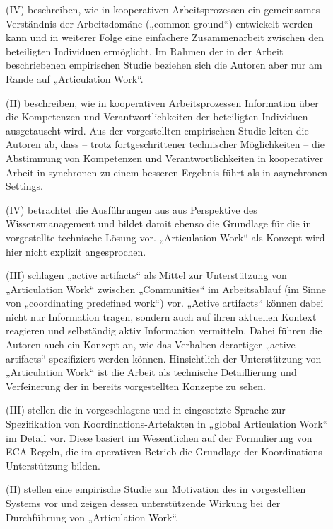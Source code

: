 \begin{description}
	\item[\citet{Convertino08}] (IV) beschreiben, wie in kooperativen Arbeitsprozessen ein gemeinsames Verständnis der Arbeitsdomäne („common ground“) entwickelt werden kann und in weiterer Folge eine einfachere Zusammenarbeit zwischen den beteiligten Individuen ermöglicht. Im Rahmen der in der Arbeit beschriebenen empirischen Studie beziehen sich die Autoren aber nur am Rande auf „Articulation Work“.
	\item[\citet{Larsen08}] (II) beschreiben, wie in kooperativen Arbeitsprozessen Information über die Kompetenzen und Verantwortlichkeiten der beteiligten Individuen ausgetauscht wird. Aus der vorgestellten empirischen Studie leiten die Autoren ab, dass -- trotz fortgeschrittener technischer Möglichkeiten -- die Abstimmung von Kompetenzen und Verantwortlichkeiten in kooperativer Arbeit in synchronen zu einem besseren Ergebnis führt als in asynchronen Settings.
	\item[\citet{Cabitza08}] (IV) betrachtet die Ausführungen aus \citet{Cabitza07} aus Perspektive des Wissensmanagement und bildet damit ebenso die Grundlage für die in \citep{Cabitza09} vorgestellte technische Lösung vor. „Articulation Work“ als Konzept wird hier nicht explizit angesprochen.
	\item[\citet{Cabitza09}] (III) schlagen „active artifacts“ als Mittel zur Unterstützung von „Articulation Work“ zwischen „Communities“ im Arbeitsablauf (im Sinne von „coordinating predefined work“) vor. „Active artifacts“ können dabei nicht nur Information tragen, sondern auch auf ihren aktuellen Kontext reagieren und selbständig aktiv Information vermitteln. Dabei führen die Autoren auch ein Konzept an, wie das Verhalten derartiger „active artifacts“ spezifiziert werden können. Hinsichtlich der Unterstützung von „Articulation Work“ ist die Arbeit als technische Detaillierung und Verfeinerung der in \citet{Cabitza06} bereits vorgestellten Konzepte zu sehen.
	\item[\citet{Cabitza09a}] (III) stellen die in \citet{Cabitza06} vorgeschlagene und in \citep{Cabitza09} eingesetzte Sprache zur Spezifikation von Koordinations-Artefakten in „global Articulation Work“ im Detail vor. Diese basiert im Wesentlichen auf der Formulierung von \gls{ECA}-Regeln, die im operativen Betrieb die Grundlage der Koordinations-Unterstützung bilden.
	\item[\citet{Cabitza09b}] (II) stellen eine empirische Studie zur Motivation des in \citep{Cabitza09} vorgestellten Systems vor und zeigen dessen unterstützende Wirkung bei der Durchführung von „Articulation Work“.
\end{description}

